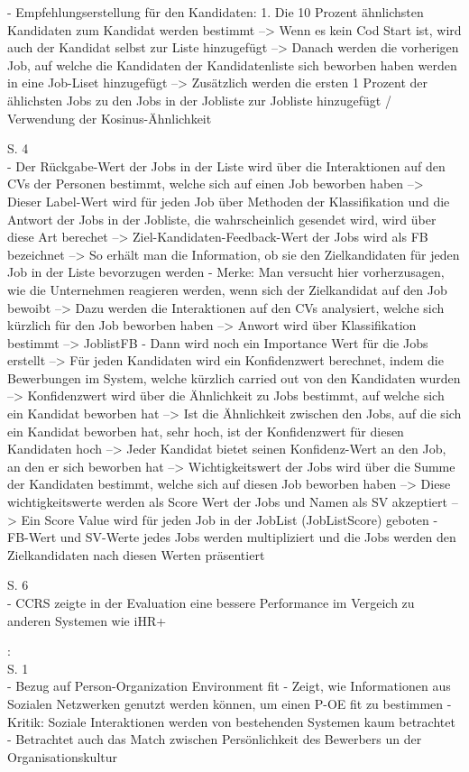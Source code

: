 - Empfehlungserstellung für den Kandidaten: 1. Die 10 Prozent ähnlichsten Kandidaten zum Kandidat werden bestimmt --> Wenn es kein Cod Start ist, wird auch der Kandidat selbst zur Liste hinzugefügt --> Danach werden die vorherigen Job, auf welche die Kandidaten der Kandidatenliste sich beworben haben werden in eine Job-Liset hinzugefügt --> Zusätzlich werden die ersten 1 Prozent der ählichsten Jobs zu den Jobs in der Jobliste zur Jobliste hinzugefügt / Verwendung der Kosinus-Ähnlichkeit

S. 4\\
- Der Rückgabe-Wert der Jobs in der Liste wird über die Interaktionen auf den CVs der Personen bestimmt, welche sich auf einen Job beworben haben --> Dieser Label-Wert wird für jeden Job über Methoden der Klassifikation und die Antwort der Jobs in der Jobliste, die wahrscheinlich gesendet wird, wird über diese Art berechet --> Ziel-Kandidaten-Feedback-Wert der Jobs wird als FB bezeichnet --> So erhält man die Information, ob sie den Zielkandidaten für jeden Job in der Liste bevorzugen werden
- Merke: Man versucht hier vorherzusagen, wie die Unternehmen reagieren werden, wenn sich der Zielkandidat auf den Job bewoibt --> Dazu werden die Interaktionen auf den CVs analysiert, welche sich kürzlich für den Job beworben haben --> Anwort wird über Klassifikation bestimmt --> JoblistFB
- Dann wird noch ein Importance Wert für die Jobs erstellt --> Für jeden Kandidaten wird ein Konfidenzwert berechnet, indem die Bewerbungen im System, welche kürzlich carried out von den Kandidaten wurden --> Konfidenzwert wird über die Ähnlichkeit zu Jobs bestimmt, auf welche sich ein Kandidat beworben hat --> Ist die Ähnlichkeit zwischen den Jobs, auf die sich ein Kandidat beworben hat, sehr hoch, ist der Konfidenzwert für diesen Kandidaten hoch --> Jeder Kandidat bietet seinen Konfidenz-Wert an den Job, an den er sich beworben hat --> Wichtigkeitswert der Jobs wird über die Summe der Kandidaten bestimmt, welche sich auf diesen Job beworben haben --> Diese wichtigkeitswerte werden als Score Wert der Jobs und Namen als SV akzeptiert --> Ein Score Value wird für jeden Job in der JobList (JobListScore) geboten
- FB-Wert und SV-Werte jedes Jobs werden multipliziert und die Jobs werden den Zielkandidaten nach diesen Werten präsentiert

S. 6\\
- CCRS zeigte in der Evaluation eine bessere Performance im Vergeich zu anderen Systemen wie iHR+

\textcite{buettner:2014}:\\
S. 1\\
- Bezug auf Person-Organization Environment fit
- Zeigt, wie Informationen aus Sozialen Netzwerken genutzt werden können, um einen P-OE fit zu bestimmen
- Kritik: Soziale Interaktionen werden von bestehenden Systemen kaum betrachtet
- Betrachtet auch das Match zwischen Persönlichkeit des Bewerbers un der Organisationskultur

